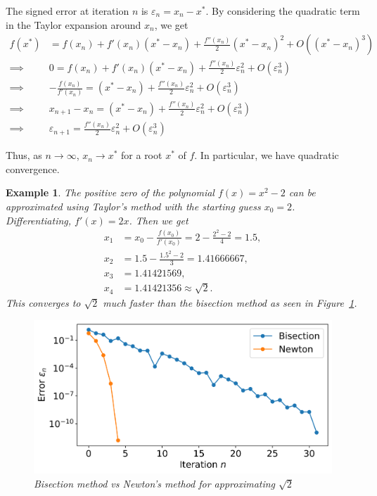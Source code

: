 \documentclass[11pt, a4paper]{article}
\renewcommand{\epsilon}{\varepsilon}
\theoremstyle{break}
\newtheorem{eg}[thm]{Example}
\begin{document}
The signed error at iteration $n$ is $\epsilon_n = x_n-x^*$. By considering the quadratic term in the Taylor expansion around $x_n$, we get \begin{align*}f(x^*)&=f(x_n)+f'(x_n)(x^*-x_n)+\frac{f''(x_n)}{2}(x^*-x_n)^2 + O((x^*-x_n)^3)\\
\implies\quad& 0 = f(x_n) + f'(x_n)(x^*-x_n)+\frac{f''(x_n)}{2}\epsilon_n^2 + O(\epsilon_n^3)\\
\implies\quad& -\frac{f(x_n)}{f'(x_n)}=(x^*-x_n)+\frac{f''(x_n)}{2}\epsilon_n^2 + O(\epsilon_n^3)\\
\implies\quad& x_{n+1}-x_n=(x^*-x_n)+\frac{f''(x_n)}{2}\epsilon_n^2 + O(\epsilon_n^3)\\
 \implies\quad&\epsilon_{n+1}=\frac{f''(x_n)}{2}\epsilon_n^2 + O(\epsilon_n^3)
\end{align*}

Thus, as $n\to \infty$, $x_{n}\to x^*$ for a root $x^*$ of $f$. In particular, we have quadratic convergence.

\begin{eg}
The positive zero of the polynomial $f(x)=x^2-2$ can be approximated using Taylor's method with the starting guess $x_0=2$. Differentiating, $f'(x)=2x$. Then we get \begin{align*}
x_1 &= x_0 - \frac{f(x_0)}{f'(x_0)} = 2 - \frac{2^2-2}{4} = 1.5,\\
x_2 &= 1.5 - \frac{1.5^2-2}{3} = 1.41666667,\\
x_3 &= 1.41421569,\\
x_4 &= 1.41421356 \approx\sqrt{2}.
\end{align*}
This converges to $\sqrt{2}$ much faster than the bisection method as seen in Figure~\ref{fig:bisectionVsNewton}.
\begin{figure}\centering
	\includegraphics[width=0.7\linewidth]{bisectionVsNewton}
	\caption{Bisection method vs Newton's method for approximating $\sqrt2$}\label{fig:bisectionVsNewton}
\end{figure}
\end{eg}
\end{document}
